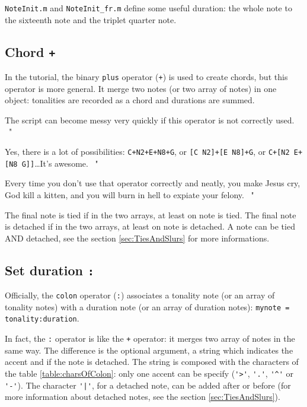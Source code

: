\documentclass{article}
\newcommand\noteInitFile{\texttt{NoteInit.m}\xspace}
\newcommand\noteInitFrFile{\texttt{NoteInit\_fr.m}\xspace}
\newenvironment{meenv}{ \par \noindent \makebox[6em][r]{ \textcolor{mecolor}{Me}: " --~}}{~"}
\newenvironment{myselfenv}{ \par \noindent \makebox[6em][r]{ \textcolor{myselfcolor}{Myself}: " --~}}{~"}
\newcommand{ \me }[1]{%
\begin{meenv}%
	#1%
\end{meenv} }
\newcommand{ \myself }[1]{%
\begin{myselfenv}%
	#1%
\end{myselfenv} }
\begin{document}
\noteInitFile and \noteInitFrFile define some useful duration: the whole note to the sixteenth note and the triplet quarter note.

\subsection{Chord \lstinline!+!}

In the tutorial, the binary \lstinline!plus! operator (\lstinline!+!) is used to create chords, but this operator is more general. It merge two notes (or two array of notes) in one object: tonalities are recorded as a chord and durations are summed.

\myself{ The script can become messy very quickly if this operator is not correctly used.}
\me{ Yes, there is a lot of possibilities: \lstinline!C+N2+E+N8+G!, or \lstinline![C N2]+[E N8]+G!, or \lstinline!C+[N2 E+[N8 G]]!\dots It's awesome. }
\myself{ Every time you don't use that operator correctly and neatly, you make Jesus cry, God kill a kitten, and you will burn in hell to expiate your felony. }

The final note is tied if in the two arrays, at least on note is tied. The final note is detached if in the two arrays, at least on note is detached. A note can be tied AND detached, see the section \ref{sec:TiesAndSlurs} for more informations.

\subsection{Set duration \lstinline!:!}

Officially, the \lstinline!colon! operator (\lstinline!:!) associates a tonality note (or an array of tonality notes) with a duration note (or an array of duration notes): \lstinline!mynote = tonality:duration!.

In fact, the \lstinline!:! operator is like the \lstinline!+! operator: it merges two array of notes in the same way. The difference is the optional argument, a string which indicates the accent and if the note is detached. The string is composed with the characters of the table \ref{table:charsOfColon}: only one accent can be specify (\lstinline!'>'!, \lstinline!'.'!, \lstinline!'^'! or \lstinline!'-'!). The character \lstinline!'|'!, for a detached note, can be added after or before (for more information about detached notes, see the section \ref{sec:TiesAndSlurs}).
\end{document}
